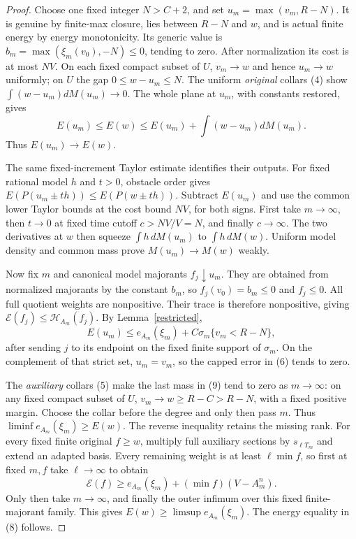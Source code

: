 \documentclass[11pt]{article}
\begin{document}
\begin{proof}
Choose one fixed integer $N>C+2$, and set
$u_m=\max(v_m,R-N)$.
It is genuine by finite-max closure, lies between $R-N$ and $w$,
and is actual finite energy by energy monotonicity.
Its generic value is
$b_m=\max(\xi_m(v_0),-N)\leq0$, tending to zero.
After normalization its cost is at most $NV$.
On each fixed compact subset of $U$, $v_m\to w$ and hence $u_m\to w$
uniformly; on $U$ the gap $0\leq w-u_m\leq N$.
The uniform \emph{original} collars (4) show
$\int(w-u_m)dM(u_m)\to0$.
The whole plane at $u_m$, with constants restored, gives
\[
 E(u_m)\leq E(w)\leq E(u_m)+\int(w-u_m)dM(u_m).
\]
Thus $E(u_m)\to E(w)$.

The same fixed-increment Taylor estimate identifies their outputs.
For fixed rational model $h$ and $t>0$, obstacle order gives
$E(P(u_m\pm th))\leq E(P(w\pm th))$.
Subtract $E(u_m)$ and use the common lower Taylor bounds at the
cost bound $NV$, for both signs.
First take $m\to\infty$, then $t\to0$ at fixed time cutoff
$c>NV/V=N$, and finally $c\to\infty$.
The two derivatives at $w$ then squeeze
$\int h\,dM(u_m)$ to $\int h\,dM(w)$.
Uniform model density and common mass prove
$M(u_m)\to M(w)$ weakly.

Now fix $m$ and canonical model majorants $f_j\downarrow u_m$.
They are obtained from normalized majorants by the constant $b_m$,
so $f_j(v_0)=b_m\leq0$ and $f_j\leq0$.
All full quotient weights are nonpositive. Their trace is therefore
nonpositive, giving
$\mathscr E(f_j)\leq\mathscr H_{A_m}(f_j)$.
By Lemma~\ref{restricted},
\[
 E(u_m)\leq e_{A_m}(\xi_m)+C\sigma_m\{v_m<R-N\},        \tag{9}
\]
after sending $j$ to its endpoint on the fixed finite support of
$\sigma_m$. On the complement of that strict set, $u_m=v_m$,
so the capped error in (6) tends to zero.

The \emph{auxiliary} collars (5) make the last mass in (9) tend
to zero as $m\to\infty$: on any fixed compact subset of $U$,
$v_m\to w\geq R-C>R-N$, with a fixed positive margin.
Choose the collar before the degree and only then pass $m$.
Thus $\liminf e_{A_m}(\xi_m)\geq E(w)$.
The reverse inequality retains the missing rank.
For every fixed finite original $f\geq w$, multiply full
auxiliary sections by $s_{\ell T_m}$ and extend an adapted basis.
Every remaining weight is at least $\ell\min f$, so first at
fixed $m,f$ take $\ell\to\infty$ to obtain
\[
 \mathscr E(f)\geq e_{A_m}(\xi_m)
                       +(\min f)(V-A_m^n).
\]
Only then take $m\to\infty$, and finally the outer infimum over
this fixed finite-majorant family. This gives
$E(w)\geq\limsup e_{A_m}(\xi_m)$.
The energy equality in (8) follows.


\end{proof}
\end{document}

